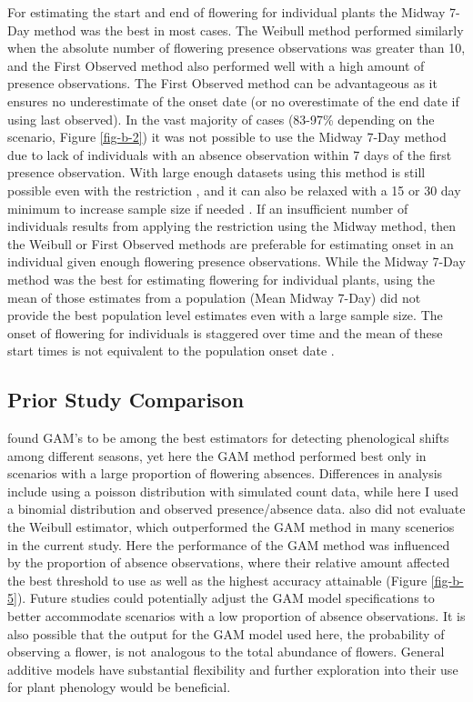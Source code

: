 For estimating the start and end of flowering for individual plants the Midway 7-Day method was the best in most cases. The Weibull method performed similarly when the absolute number of flowering presence observations was greater than 10, and the First Observed method also performed well with a high amount of presence observations. The First Observed method can be advantageous as it ensures no underestimate of the onset date (or no overestimate of the end date if using last observed). In the vast majority of cases (83-97\% depending on the scenario, Figure \ref{fig-b-2}) it was not possible to use the Midway 7-Day method due to lack of individuals with an absence observation within 7 days of the first presence observation. With large enough datasets using this method is still possible even with the restriction \citep{gerst2016}, and it can also be relaxed with a 15 or 30 day minimum to increase sample size if needed \citep{taylor2019}. If an insufficient number of individuals results from applying the restriction using the Midway method, then the Weibull or First Observed methods are preferable for estimating onset in an individual given enough flowering presence observations. While the Midway 7-Day method was the best for estimating flowering for individual plants, using the mean of those estimates from a population (Mean Midway 7-Day) did not provide the best population level estimates even with a large sample size. The onset of flowering for individuals is staggered over time and the mean of these start times is not equivalent to the population onset date  \citep{ison2014, dekeyzer2017, renzi2019}. 

\subsection{Prior Study Comparison}

\cite{moussus2010} found GAM’s to be among the best estimators for detecting phenological shifts among different seasons, yet here the GAM method performed best only in scenarios with a large proportion of flowering absences. Differences in analysis include \cite{moussus2010} using a poisson distribution with simulated count data, while here I used a binomial distribution and observed presence/absence data.  \cite{moussus2010} also did not evaluate the Weibull estimator, which outperformed the GAM method in many scenerios in the current study. Here the performance of the GAM method was influenced by the proportion of absence observations, where their relative amount affected the best threshold to use as well as the highest accuracy attainable (Figure \ref{fig-b-5}). Future studies could potentially adjust the GAM model specifications to better accommodate scenarios with a low proportion of absence observations. It is also possible that the output for the GAM model used here, the probability of observing a flower, is not analogous to the total abundance of flowers. General additive models have substantial flexibility \citep{wood2017, simpson2018, pedersen2018} and further exploration into their use for plant phenology would be beneficial. 

